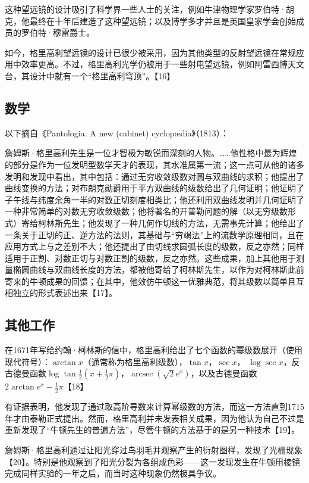 这种望远镜的设计吸引了科学界一些人士的关注，例如牛津物理学家罗伯特·胡克，他最终在十年后建造了这种望远镜；以及博学多才并且是英国皇家学会创始成员的罗伯特·穆雷爵士。

如今，格里高利望远镜的设计已很少被采用，因为其他类型的反射望远镜在常规应用中效率更高。不过，格里高利光学仍被用于一些射电望远镜，例如阿雷西博天文台，其设计中就有一个“格里高利穹顶”。【16】
\subsection{数学}
以下摘自《Pantologia. A new (cabinet) cyclopædia》（1813）：

詹姆斯·格里高利先生是一位才智极为敏锐而深刻的人物。……他性格中最为辉煌的部分是作为一位发明型数学天才的表现，其水准属第一流；这一点可从他的诸多发明和发现中看出，其中包括：通过无穷收敛级数对圆与双曲线的求积；他提出了曲线变换的方法；对布朗克勋爵用于平方双曲线的级数给出了几何证明；他证明了子午线与纬度余角一半的对数正切刻度相类比；他还利用双曲线发明并几何证明了一种非常简单的对数无穷收敛级数；他将著名的开普勒问题的解（以无穷级数形式）寄给柯林斯先生；他发现了一种几何作切线的方法，无需事先计算；他给出了一条关于正切的正、逆方法的法则，其基础与“穷竭法”上的流数学原理相同，且在应用方式上与之差别不大；他还提出了由切线求圆弧长度的级数，反之亦然；同样适用于正割、对数正切与对数正割的级数，反之亦然。这些成果，加上其他用于测量椭圆曲线与双曲线长度的方法，都被他寄给了柯林斯先生，以作为对柯林斯此前寄来的牛顿成果的回馈；在其中，他效仿牛顿这一优雅典范，将其级数以简单且互相独立的形式表述出来【17】。
\subsection{其他工作}
在1671年写给约翰·柯林斯的信中，格里高利给出了七个函数的幂级数展开（使用现代符号）：$\arctan x $（通常称为格里高利级数），$\tan x$，$\sec x$， 
$\log \sec x$，反古德曼函数$\log \tan \tfrac{1}{2}\left(x+\tfrac{1}{2}\pi\right)$，$\operatorname{arcsec}\!\left(\sqrt{2}e^x\right)$，以及古德曼函数$2\arctan e^x - \tfrac{1}{2}\pi$【18】  

有证据表明，他发现了通过取高阶导数来计算幂级数的方法，而这一方法直到1715年才由泰勒正式提出。然而，格里高利并未发表相关成果，因为他认为自己不过是重新发现了“牛顿先生的普遍方法”，尽管牛顿的方法基于的是另一种技术【19】。  

詹姆斯·格里高利通过让阳光穿过鸟羽毛并观察产生的衍射图样，发现了光栅现象【20】。特别是他观察到了阳光分裂为各组成色彩——这一发现发生在牛顿用棱镜完成同样实验的一年之后，而当时这种现象仍然极具争议。  

